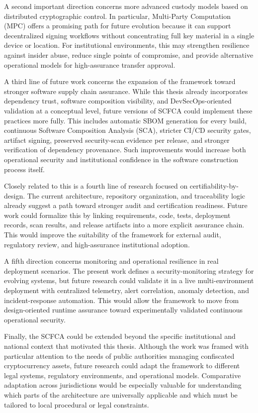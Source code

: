 \documentclass[12pt,a4paper]{report}
\begin{document}
A second important direction concerns more advanced custody models based on distributed cryptographic control. In particular, Multi-Party Computation (MPC) offers a promising path for future evolution because it can support decentralized signing workflows without concentrating full key material in a single device or location. For institutional environments, this may strengthen resilience against insider abuse, reduce single points of compromise, and provide alternative operational models for high-assurance transfer approval.

A third line of future work concerns the expansion of the framework toward stronger software supply chain assurance. While this thesis already incorporates dependency trust, software composition visibility, and DevSecOps-oriented validation at a conceptual level, future versions of SCFCA could implement these practices more fully. This includes automatic SBOM generation for every build, continuous Software Composition Analysis (SCA), stricter CI/CD security gates, artifact signing, preserved security-scan evidence per release, and stronger verification of dependency provenance. Such improvements would increase both operational security and institutional confidence in the software construction process itself.

Closely related to this is a fourth line of research focused on certifiability-by-design. The current architecture, repository organization, and traceability logic already suggest a path toward stronger audit and certification readiness. Future work could formalize this by linking requirements, code, tests, deployment records, scan results, and release artifacts into a more explicit assurance chain. This would improve the suitability of the framework for external audit, regulatory review, and high-assurance institutional adoption.

A fifth direction concerns monitoring and operational resilience in real deployment scenarios. The present work defines a security-monitoring strategy for evolving systems, but future research could validate it in a live multi-environment deployment with centralized telemetry, alert correlation, anomaly detection, and incident-response automation. This would allow the framework to move from design-oriented runtime assurance toward experimentally validated continuous operational security.

Finally, the SCFCA could be extended beyond the specific institutional and national context that motivated this thesis. Although the work was framed with particular attention to the needs of public authorities managing confiscated cryptocurrency assets, future research could adapt the framework to different legal systems, regulatory environments, and operational models. Comparative adaptation across jurisdictions would be especially valuable for understanding which parts of the architecture are universally applicable and which must be tailored to local procedural or legal constraints.
\end{document}
